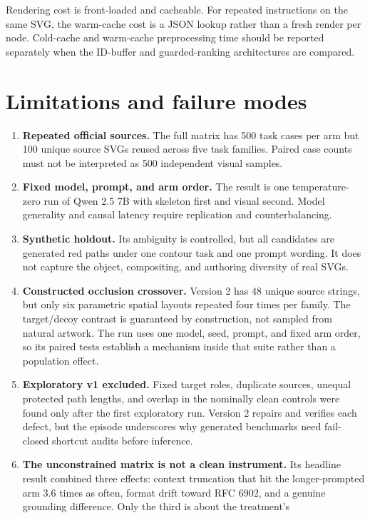 \documentclass[10pt,a4paper]{article}
\begin{document}
Rendering cost is front-loaded and cacheable. For repeated instructions on the
same SVG, the warm-cache cost is a JSON lookup rather than a fresh render per
node. Cold-cache and warm-cache preprocessing time should be reported
separately when the ID-buffer and guarded-ranking architectures are compared.

\section{Limitations and failure modes}

\begin{enumerate}
  \item \textbf{Repeated official sources.} The full matrix has 500 task cases
  per arm but 100 unique source SVGs reused across five task families. Paired
  case counts must not be interpreted as 500 independent visual samples.
  \item \textbf{Fixed model, prompt, and arm order.} The result is one
  temperature-zero run of Qwen 2.5 7B with skeleton first and visual second.
  Model generality and causal latency require replication and counterbalancing.
  \item \textbf{Synthetic holdout.} Its ambiguity is controlled, but all
  candidates are generated red paths under one contour task and one prompt
  wording. It does not capture the object, compositing, and authoring diversity
  of real SVGs.
  \item \textbf{Constructed occlusion crossover.} Version 2 has 48 unique
  source strings, but only six parametric spatial layouts repeated four times
  per family. The target/decoy contrast is guaranteed by construction, not
  sampled from natural artwork. The run uses one model, seed, prompt, and fixed
  arm order, so its paired tests establish a mechanism inside that suite rather
  than a population effect.
  \item \textbf{Exploratory v1 excluded.} Fixed target roles, duplicate
  sources, unequal protected path lengths, and overlap in the nominally clean
  controls were found only after the first exploratory run. Version 2 repairs
  and verifies each defect, but the episode underscores why generated
  benchmarks need fail-closed shortcut audits before inference.
  \item \textbf{The unconstrained matrix is not a clean instrument.} Its
  headline result combined three effects: context truncation that hit the
  longer-prompted arm 3.6 times as often, format drift toward RFC 6902, and a
  genuine grounding difference. Only the third is about the treatment's

\end{enumerate}
\end{document}
